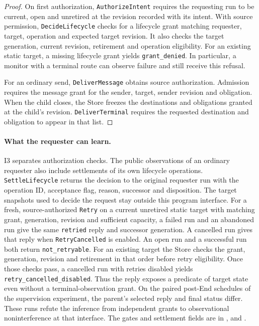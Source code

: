 \documentclass[11pt,a4paper]{article}
\theoremstyle{definition}
\theoremstyle{remark}
\begin{document}
\begin{proof}
On first authorization, \texttt{AuthorizeIntent} requires the requesting run to be current, open and unretired at the revision recorded with its intent. With source permission, \texttt{DecideLifecycle} checks for a lifecycle grant matching requester, target, operation and expected target revision. It also checks the target generation, current revision, retirement and operation eligibility. For an existing static target, a missing lifecycle grant yields \texttt{grant\_denied}. In particular, a monitor with a terminal route can observe failure and still receive this refusal.

For an ordinary send, \texttt{DeliverMessage} obtains source authorization. Admission requires the message grant for the sender, target, sender revision and obligation. When the child closes, the Store freezes the destinations and obligations granted at the child's revision. \texttt{DeliverTerminal} requires the requested destination and obligation to appear in that list.
\end{proof}

\paragraph{What the requester can learn.} I3 separates authorization checks. The public observations of an ordinary requester also include settlements of its own lifecycle operations. \texttt{SettleLifecycle} returns the decision to the original requester run with the operation ID, acceptance flag, reason, successor and disposition. The target snapshots used to decide the request stay outside this program interface. For a fresh, source-authorized \texttt{Retry} on a current unretired static target with matching grant, generation, revision and sufficient capacity, a failed run and an abandoned run give the same \texttt{retried} reply and successor generation. A cancelled run gives that reply when \texttt{RetryCancelled} is enabled. An open run and a successful run both return \texttt{not\_retryable}. For an existing target the Store checks the grant, generation, revision and retirement in that order before retry eligibility. Once those checks pass, a cancelled run with retries disabled yields \texttt{retry\_cancelled\_disabled}. Thus the reply exposes a predicate of target state even without a terminal-observation grant. On the paired post-End schedules of the supervision experiment, the parent's selected reply and final status differ. These runs refute the inference from independent grants to observational noninterference at that interface. The gates and settlement fields are in ,  and .
\end{document}
